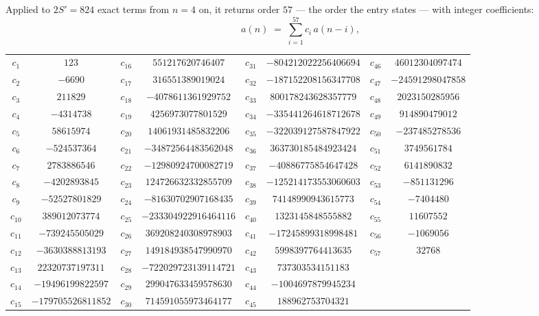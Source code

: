 \documentclass[11pt,a4paper]{article}
\theoremstyle{plain}
\theoremstyle{definition}
\begin{document}
Applied to $2S'=824$ exact terms from $n=4$ on, it returns order $57$ --- the
order the entry states --- with integer coefficients:
\[
a(n)\;=\;\sum_{i=1}^{57}c_i\,a(n-i),
\]
\begin{center}\small
\begin{tabular}{cccccccc}
$c_{1}$ & $123$ & $c_{16}$ & $551217620746407$ & $c_{31}$ & $-804212022256406694$ & $c_{46}$ & $46012304097474$ \\
$c_{2}$ & $-6690$ & $c_{17}$ & $316551389019024$ & $c_{32}$ & $-187152208156347708$ & $c_{47}$ & $-24591298047858$ \\
$c_{3}$ & $211829$ & $c_{18}$ & $-4078611361929752$ & $c_{33}$ & $800178243628357779$ & $c_{48}$ & $2023150285956$ \\
$c_{4}$ & $-4314738$ & $c_{19}$ & $4256973077801529$ & $c_{34}$ & $-335441264618712678$ & $c_{49}$ & $914890479012$ \\
$c_{5}$ & $58615974$ & $c_{20}$ & $14061931485832206$ & $c_{35}$ & $-322039127587847922$ & $c_{50}$ & $-237485278536$ \\
$c_{6}$ & $-524537364$ & $c_{21}$ & $-34872564483562048$ & $c_{36}$ & $363730185484923424$ & $c_{51}$ & $3749561784$ \\
$c_{7}$ & $2783886546$ & $c_{22}$ & $-12980924700082719$ & $c_{37}$ & $-40886775854647428$ & $c_{52}$ & $6141890832$ \\
$c_{8}$ & $-4202893845$ & $c_{23}$ & $124726632332855709$ & $c_{38}$ & $-125214173553060603$ & $c_{53}$ & $-851131296$ \\
$c_{9}$ & $-52527801829$ & $c_{24}$ & $-81630702907168435$ & $c_{39}$ & $74148990943615773$ & $c_{54}$ & $-7404480$ \\
$c_{10}$ & $389012073774$ & $c_{25}$ & $-233304922916464116$ & $c_{40}$ & $1323145848555882$ & $c_{55}$ & $11607552$ \\
$c_{11}$ & $-739245505029$ & $c_{26}$ & $369208240308978903$ & $c_{41}$ & $-17245899318998481$ & $c_{56}$ & $-1069056$ \\
$c_{12}$ & $-3630388813193$ & $c_{27}$ & $149184938547990970$ & $c_{42}$ & $5998397764413635$ & $c_{57}$ & $32768$ \\
$c_{13}$ & $22320737197311$ & $c_{28}$ & $-722029723139114721$ & $c_{43}$ & $737303534151183$ &  &  \\
$c_{14}$ & $-19496199822597$ & $c_{29}$ & $299047633459578630$ & $c_{44}$ & $-1004697879945234$ &  &  \\
$c_{15}$ & $-179705526811852$ & $c_{30}$ & $714591055973464177$ & $c_{45}$ & $188962753704321$ &  &  \\
\end{tabular}
\end{center}
\end{document}
